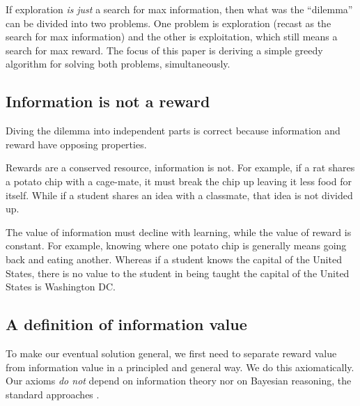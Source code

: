 \documentclass[10pt,letterpaper]{article}
\begin{document}
If exploration \textit{is} \textit{just} a search for max information, then what was the ``dilemma'' can be divided into two problems. One problem is exploration (recast as the search for max information) and the other is exploitation, which still means a search for max reward. The focus of this paper is deriving a simple greedy algorithm for solving both problems, simultaneously.

\subsection{Information is not a reward}
Diving the dilemma into independent parts is correct because information and reward have opposing properties.

Rewards are a conserved resource, information is not. For example, if a rat shares a potato chip with a cage-mate, it must break the chip up leaving it less food for itself. While if a student shares an idea with a classmate, that idea is not divided up. 

The value of information must decline with learning, while the value of reward is constant. For example, knowing where one potato chip is generally means going back and eating another. Whereas if a student knows the capital of the United States, there is no value to the student in being taught the capital of the United States is Washington DC.



\subsection{A definition of information value}
To make our eventual solution general, we first need to separate reward value from information value in a principled and general way. We do this axiomatically. Our axioms \textit{do not} depend on information theory nor on Bayesian reasoning, the standard approaches \cite{Friston2016,Haarnoja2018,Itti2009}. 
\end{document}

